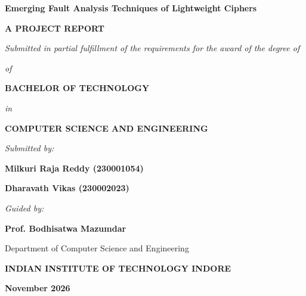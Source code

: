 \begin{titlepage}
\centering
\vspace*{0.5cm}
{\huge \textbf{Emerging Fault Analysis Techniques of Lightweight Ciphers}\par}
\vspace{1.5cm}
{\Large \textbf{A PROJECT REPORT}\par}
\vspace{0.5cm}
{\large \textit{Submitted in partial fulfillment of the requirements for the award of the degree of}\par}
\vspace{0.3cm}
{\large \textit{of}\par}
\vspace{0.3cm}
{\Large \textbf{BACHELOR OF TECHNOLOGY}\par}
\vspace{0.3cm}
{\large \textit{in}\par}
\vspace{0.3cm}
{\Large \textbf{COMPUTER SCIENCE AND ENGINEERING}\par}
\vspace{1.5cm}
{\large \textit{Submitted by:}\par}
\vspace{0.3cm}
{\Large \textbf{Milkuri Raja Reddy (230001054)}\par}
\vspace{0.2cm}
{\Large \textbf{Dharavath Vikas (230002023)}\par}
\vspace{1.5cm}
{\large \textit{Guided by:}\par}
\vspace{0.3cm}
{\Large \textbf{Prof. Bodhisatwa Mazumdar}\par}
\vspace{0.2cm}
{\large Department of Computer Science and Engineering\par}
\vfill
{\Large \textbf{INDIAN INSTITUTE OF TECHNOLOGY INDORE}\par}
\vspace{0.3cm}
{\Large \textbf{November 2026}\par}
\vspace*{0.5cm}
\end{titlepage}

\cleardoublepage
{}
\setcounter{page}{4}

